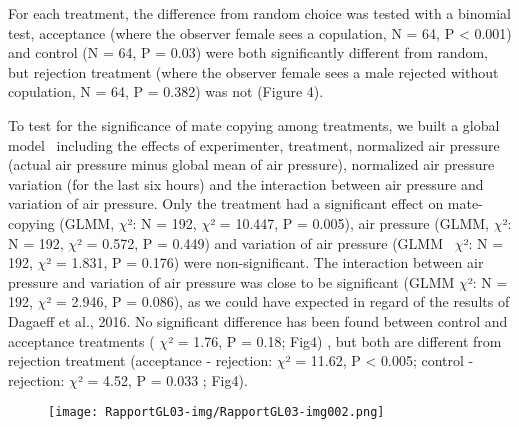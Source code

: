 \documentclass{article}
\begin{document}
For each treatment, the difference from random choice was tested with a binomial test, acceptance (where the observer female sees a copulation, N = 64, P {\textless} 0.001) and control (N = 64, P = 0.03) were both significantly different from random, but rejection treatment (where the observer female sees a male rejected without copulation, N = 64, P = 0.382) was not (Figure 4).


\bigskip

To test for the significance of mate copying among treatments, we built a global model \ including the effects of experimenter, treatment, normalized air pressure (actual air pressure minus global mean of air pressure), normalized air pressure variation (for the last six hours) and the interaction between air pressure and variation of air pressure. Only the treatment had a significant effect on mate-copying (GLMM, $\chi $²: N = 192, $\chi $² = 10.447, P = 0.005), air pressure (GLMM, $\chi $²: N = 192, $\chi $² = 0.572, P = 0.449) and variation of air pressure (GLMM \ $\chi $²: N = 192, $\chi $² = 1.831, P = 0.176) were non-significant. The interaction between air pressure and variation of air pressure was close to be significant (GLMM $\chi $²: N = 192, $\chi $² = 2.946, P = 0.086), as we could have expected in regard of the results of Dagaeff et al., 2016. No significant difference has been found between control and acceptance treatments ( $\chi $² = 1.76, P = 0.18; Fig4) , but both are different from rejection treatment (acceptance - rejection: $\chi $² = 11.62, P {\textless} 0.005; control - rejection: $\chi $² = 4.52, P = 0.033 ; Fig4).


\bigskip


\bigskip


\bigskip


\bigskip


\bigskip


\bigskip


\bigskip


\bigskip



\begin{figure}
\centering
\texttt{[image: RapportGL03-img/RapportGL03-img002.png]}
\end{figure}

\bigskip


\bigskip


\bigskip


\bigskip


\bigskip


\bigskip


\bigskip


\bigskip


\bigskip


\bigskip


\bigskip


\bigskip


\bigskip


\bigskip


\bigskip
\end{document}
